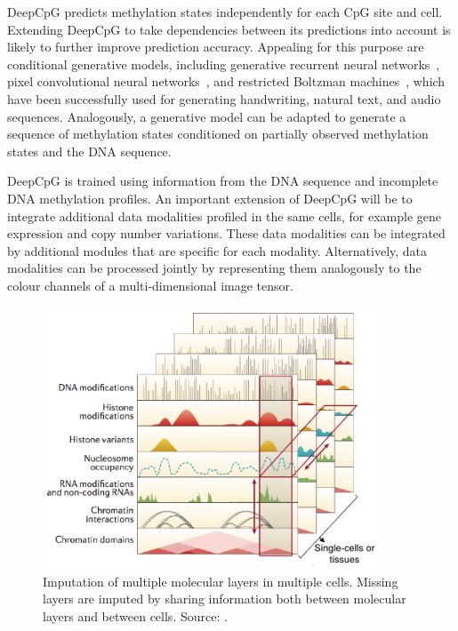DeepCpG predicts methylation states independently for each CpG site and cell. Extending DeepCpG to take dependencies between its predictions into account is likely to further improve prediction accuracy. Appealing for this purpose are conditional generative models, including generative recurrent neural networks~\citep{graves_generating_2013, chung_recurrent_2015}, pixel convolutional neural networks~\citep{oord_pixel_2016,kalchbrenner_neural_2016,oord_wavenet:_2016}, and restricted Boltzman machines~\citep{sutskever_recurrent_2009,boulanger-lewandowski_modeling_2012,boulanger-lewandowski_high-dimensional_2013,bayer_learning_2014}, which have been successfully used for generating handwriting, natural text, and audio sequences. Analogously, a generative model can be adapted to generate a sequence of methylation states conditioned on partially observed methylation states and the DNA sequence.

DeepCpG is trained using information from the DNA sequence and incomplete DNA methylation profiles. An important extension of DeepCpG will be to integrate additional data modalities profiled in the same cells, for example gene expression and copy number variations. These data modalities can be integrated by additional modules that are specific for each modality. Alternatively, data modalities can be processed jointly by representing them analogously to the colour channels of a multi-dimensional image tensor.

\begin{figure}[htbp!]
\centering
\includegraphics[width=0.9\textwidth]{multi}
\caption[Imputation of multiple molecular layers in multiple cells.]{Imputation of multiple molecular layers in multiple cells. Missing layers are imputed by sharing information both between molecular layers and between cells. Source: \citet{stricker_profiles_2016}.}
\label{fig:sum_multi}
\end{figure}

